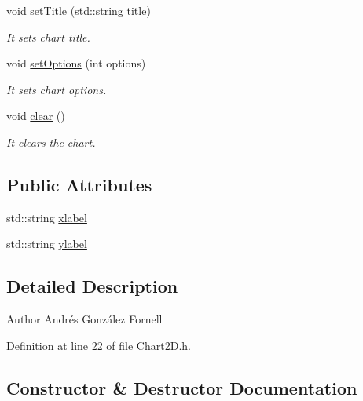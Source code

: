 \begin{DoxyCompactItemize}
void \hyperlink{class_chart2_d_ac148952b822fcb1d0c865a7f36af85e4}{set\+Title} (std\+::string title)
\begin{DoxyCompactList}\small\item\em It sets chart title. \end{DoxyCompactList}\item 
void \hyperlink{class_chart2_d_a7a871b06da3b23bd7b452b75107132a6}{set\+Options} (int options)
\begin{DoxyCompactList}\small\item\em It sets chart options. \end{DoxyCompactList}\item 
\mbox{\label{class_chart2_d_adc92e3ebe94275e02cf547c81d0410e9}} 
void \hyperlink{class_chart2_d_adc92e3ebe94275e02cf547c81d0410e9}{clear} ()
\begin{DoxyCompactList}\small\item\em It clears the chart. \end{DoxyCompactList}\end{DoxyCompactItemize}
\subsection*{Public Attributes}
\begin{DoxyCompactItemize}
\item 
std\+::string \hyperlink{class_chart2_d_af463dc0d42e747ab4a208a44db003bd7}{xlabel}
\item 
std\+::string \hyperlink{class_chart2_d_afc4139568c9a63b3bcdc4eeefc0dd2e8}{ylabel}
\end{DoxyCompactItemize}


\subsection{Detailed Description}
\begin{DoxyAuthor}{Author}
Andrés González Fornell 
\end{DoxyAuthor}


Definition at line 22 of file Chart2\+D.\+h.



\subsection{Constructor \& Destructor Documentation}
\mbox{\label{class_chart2_d_a6883ce065d3a6a52f6f72efdf35d62aa}} 
